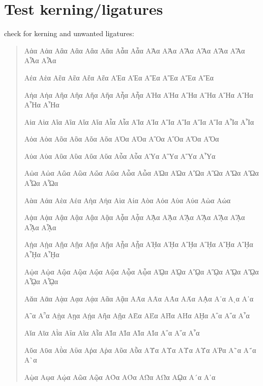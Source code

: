 \documentclass[a4paper]{scrartcl}
\begin{document}
\section{Test kerning/ligatures}


check for kerning and unwanted ligatures:

\begin{quote}
  \greekscript

Αἀα Αἁα Αἂα Αἃα Αἄα Αἅα Αἆα Αἇα ΑἈα ΑἉα ΑἊα ΑἋα ΑἌα ΑἍα ΑἎα ΑἏα

Αἐα Αἑα Αἒα Αἓα Αἔα Αἕα ΑἘα ΑἙα ΑἚα ΑἛα ΑἜα ΑἝα

Αἠα Αἡα Αἢα Αἣα Αἤα Αἥα Αἦα Αἧα ΑἨα ΑἩα ΑἪα ΑἫα ΑἬα ΑἭα ΑἮα ΑἯα

Αἰα Αἱα Αἲα Αἳα Αἴα Αἵα Αἶα Αἷα ΑἸα ΑἹα ΑἺα ΑἻα ΑἼα ΑἽα ΑἾα ΑἿα

Αὀα Αὁα Αὂα Αὃα Αὄα Αὅα ΑὈα ΑὉα ΑὊα ΑὋα ΑὌα ΑὍα

Αὐα Αὑα Αὒα Αὓα Αὔα Αὕα Αὖα Αὗα ΑὙα ΑὛα ΑὝα ΑὟα

Αὠα Αὡα Αὢα Αὣα Αὤα Αὥα Αὦα Αὧα ΑὨα ΑὩα ΑὪα ΑὫα ΑὬα ΑὭα ΑὮα ΑὯα

Αὰα Αάα Αὲα Αέα Αὴα Αήα Αὶα Αία Αὸα Αόα Αὺα Αύα Αὼα Αώα

Αᾀα Αᾁα Αᾂα Αᾃα Αᾄα Αᾅα Αᾆα Αᾇα Αᾈα Αᾉα Αᾊα Αᾋα Αᾌα Αᾍα Αᾎα Αᾏα

Αᾐα Αᾑα Αᾒα Αᾓα Αᾔα Αᾕα Αᾖα Αᾗα Αᾘα Αᾙα Αᾚα Αᾛα Αᾜα Αᾝα Αᾞα Αᾟα

Αᾠα Αᾡα Αᾢα Αᾣα Αᾤα Αᾥα Αᾦα Αᾧα Αᾨα Αᾩα Αᾪα Αᾫα Αᾬα Αᾭα Αᾮα Αᾯα

Αᾰα Αᾱα Αᾲα Αᾳα Αᾴα Αᾶα Αᾷα ΑᾸα ΑᾹα ΑᾺα ΑΆα Αᾼα Α᾽α Αια Α᾿α

Α῀α Α῁α Αῂα Αῃα Αῄα Αῆα Αῇα ΑῈα ΑΈα ΑῊα ΑΉα Αῌα Α῍α Α῎α Α῏α

Αῐα Αῑα Αῒα Αΐα Αῖα Αῗα ΑῘα ΑῙα ΑῚα ΑΊα Α῝α Α῞α Α῟α

Αῠα Αῡα Αῢα Αΰα Αῤα Αῥα Αῦα Αῧα ΑῨα ΑῩα ΑῪα ΑΎα ΑῬα Α῭α Α΅α Α`α

Αῲα Αῳα Αῴα Αῶα Αῷα ΑῸα ΑΌα ΑῺα ΑΏα Αῼα Α´α Α῾α

\end{quote}
\end{document}
